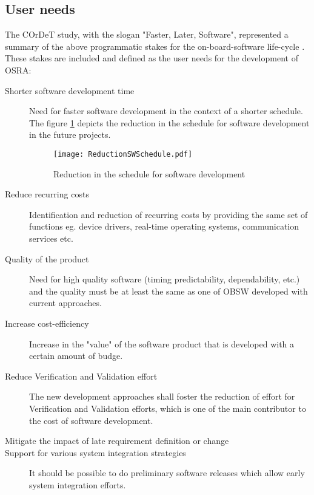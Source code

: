 \subsection{User needs}

The COrDeT study, with the slogan "Faster, Later, Software", represented a summary of the above programmatic stakes for the on-board-software life-cycle \cite{CORDET,SAVOIR}. These stakes are included and defined as the user needs \cite{SAVOIR,PhdThesis} for the development of OSRA:

\begin{description}
\item [Shorter software development time] Need for faster software development in the context of a shorter schedule. The figure \cref{fig:RedSWSched} depicts the reduction in the schedule for software development in the future projects. 

\begin{figure}[h]
	\centering
	\texttt{[image: ReductionSWSchedule.pdf]}
	\caption{Reduction in the schedule for software development}
	\label{fig:RedSWSched}
\end{figure}

\item [Reduce recurring costs] Identification and reduction of recurring costs by providing the same set of functions eg. device drivers, real-time operating systems, communication services etc.   

\item [Quality of the product] Need for high quality software (timing predictability, dependability, etc.) and the quality must be at least the same as one of OBSW developed with current approaches.

\item [Increase cost-efficiency] Increase in the "value" of the software product that is developed with a certain amount of budge.

\item [Reduce Verification and Validation effort] The new development approaches shall foster the reduction of effort for Verification and Validation efforts, which is one of the main contributor to the cost of software development.

\item [Mitigate the impact of late requirement definition or change] 

\item [Support for various system integration strategies] It should be possible to do preliminary software releases which allow early system integration efforts.


\end{description}
